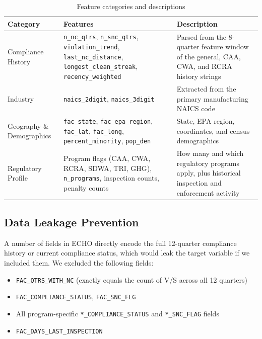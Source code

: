 \documentclass[11pt]{article}
\begin{document}
\begin{table}[H]
\centering
\caption{Feature categories and descriptions}
\small
\begin{tabular}{p{3.2cm} p{4cm} p{5cm}}
\toprule
\textbf{Category} & \textbf{Features} & \textbf{Description} \\
\midrule
Compliance History & \texttt{n\_nc\_qtrs}, \texttt{n\_snc\_qtrs}, \texttt{violation\_trend}, \texttt{last\_nc\_distance}, \texttt{longest\_clean\_streak}, \texttt{recency\_weighted} & Parsed from the 8-quarter feature window of the general, CAA, CWA, and RCRA history strings \\
\addlinespace
Industry & \texttt{naics\_2digit}, \texttt{naics\_3digit} & Extracted from the primary manufacturing NAICS code \\
\addlinespace
Geography \& Demographics & \texttt{fac\_state}, \texttt{fac\_epa\_region}, \texttt{fac\_lat}, \texttt{fac\_long}, \texttt{percent\_minority}, \texttt{pop\_den} & State, EPA region, coordinates, and census demographics \\
\addlinespace
Regulatory Profile & Program flags (CAA, CWA, RCRA, SDWA, TRI, GHG), \texttt{n\_programs}, inspection counts, penalty counts & How many and which regulatory programs apply, plus historical inspection and enforcement activity \\
\bottomrule
\end{tabular}
\end{table}

\subsection{Data Leakage Prevention}

A number of fields in ECHO directly encode the full 12-quarter compliance history or current compliance status, which would leak the target variable if we included them. We excluded the following fields:

\begin{itemize}[nosep]
    \item \texttt{FAC\_QTRS\_WITH\_NC} (exactly equals the count of V/S across all 12 quarters)
    \item \texttt{FAC\_COMPLIANCE\_STATUS}, \texttt{FAC\_SNC\_FLG}
    \item All program-specific \texttt{*\_COMPLIANCE\_STATUS} and \texttt{*\_SNC\_FLAG} fields
    \item \texttt{FAC\_DAYS\_LAST\_INSPECTION}
\end{itemize}
\end{document}
